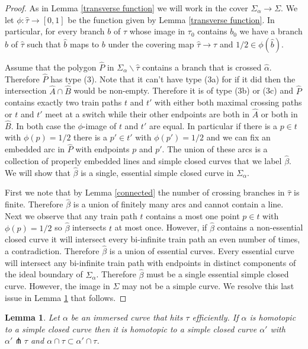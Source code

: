 \documentclass[11pt]{article}
\newtheorem{lemma}[thm]{Lemma}
\theoremstyle{remark}
\begin{document}
\begin{proof} 
As in Lemma \ref{transverse function} we will work in the cover $\Sigma_\alpha\to \Sigma$. We let $\phi\colon\hat\tau\to [0,1]$ be the function given by Lemma \ref{transverse function}. In particular, for every branch $b$ of $\tau$ whose image in $\tau_0$ contains $b_0$ we have a branch $\hat b$ of $\hat\tau$ such that $\hat b$ maps to $b$ under the covering map $\hat\tau\to\tau$ and $1/2 \in \phi(\hat b)$.


Assume that the polygon $\hat P$ in $\Sigma_\alpha\smallsetminus \hat\tau$ contains a branch that is crossed $\hat\alpha$. Therefore $\hat P$ has type (3). Note that it can't have type (3a) for if it did then the intersection $\hat{A} \cap \hat{B}$ would be non-empty. Therefore it is of type (3b) or (3c) and $\hat P$ contains exactly two train paths $t$ and $t'$ with either both maximal crossing paths or $t$ and $t'$ meet at a switch while their other endpoints are both in $\hat{A}$ or both in $\hat{B}$. In both case the $\phi$-image of $t$ and $t'$ are equal. In particular if there is a $p \in t$ with $\phi(p) = 1/2$ there is a $p' \in t'$ with $\phi(p') =1/2$ and we can fix an embedded arc in $\hat P$ with endpoints $p$ and $p'$. The union of these arcs is a collection of properly embedded lines and simple closed curves that we label $\hat \beta$. We will show that $\hat\beta$ is a single, essential simple closed curve in $\Sigma_\alpha$.

First we note that by Lemma \ref{connected} the number of crossing branches in $\hat\tau$ is finite. Therefore $\hat\beta$ is a union of finitely many arcs and cannot contain a line. Next we observe that any train path $t$ contains a most one point $p \in t$ with $\phi(p) = 1/2$ so $\hat\beta$ intersects $t$ at most once. However, if $\hat\beta$ contains a non-essential closed curve it will intersect every bi-infinite train path an even number of times, a contradiction. Therefore $\hat\beta$ is a union of essential curves. Every essential curve will intersect any bi-infinite train path with endpoints in distinct components of the ideal boundary of $\Sigma_\alpha$. Therefore $\hat\beta$ must be a single essential simple closed curve.
However, the image in $\Sigma$ may not be a simple curve. We resolve this last issue in  Lemma \ref{homotope to simple} that follows.
\end{proof}

\begin{lemma}\label{homotope to simple}
Let $\alpha$ be an immersed curve that hits $\tau$ efficiently. If $\alpha$ is homotopic to a simple closed curve then it is homotopic to a simple closed curve $\alpha'$ with $\alpha'\pitchfork \tau$ and $\alpha \cap \tau \subset \alpha' \cap \tau$.
\end{lemma}
\end{document}
